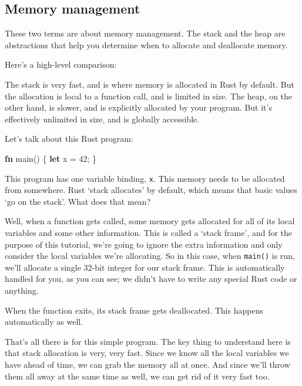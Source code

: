 \documentclass[a4paper,]{book}
\newenvironment{Shaded}{\begin{snugshade}}{\end{snugshade}}
\newcommand{\KeywordTok}[1]{\textcolor[rgb]{0.13,0.29,0.53}{\textbf{{#1}}}}
\newcommand{\DecValTok}[1]{\textcolor[rgb]{0.00,0.00,0.81}{{#1}}}
\newcommand{\NormalTok}[1]{{#1}}
\begin{document}
\subsection{Memory management}\label{memory-management}

These two terms are about memory management. The stack and the heap are
abstractions that help you determine when to allocate and deallocate
memory.

Here's a high-level comparison:

The stack is very fast, and is where memory is allocated in Rust by
default. But the allocation is local to a function call, and is limited
in size. The heap, on the other hand, is slower, and is explicitly
allocated by your program. But it's effectively unlimited in size, and
is globally accessible.


Let's talk about this Rust program:

\begin{Shaded}
\begin{Highlighting}[]
\KeywordTok{fn} \NormalTok{main() \{}
    \KeywordTok{let} \NormalTok{x = }\DecValTok{42}\NormalTok{;}
\NormalTok{\}}
\end{Highlighting}
\end{Shaded}

This program has one variable binding, \texttt{x}. This memory needs to
be allocated from somewhere. Rust `stack allocates' by default, which
means that basic values `go on the stack'. What does that mean?

Well, when a function gets called, some memory gets allocated for all of
its local variables and some other information. This is called a `stack
frame', and for the purpose of this tutorial, we're going to ignore the
extra information and only consider the local variables we're
allocating. So in this case, when \texttt{main()} is run, we'll allocate
a single 32-bit integer for our stack frame. This is automatically
handled for you, as you can see; we didn't have to write any special
Rust code or anything.

When the function exits, its stack frame gets deallocated. This happens
automatically as well.

That's all there is for this simple program. The key thing to understand
here is that stack allocation is very, very fast. Since we know all the
local variables we have ahead of time, we can grab the memory all at
once. And since we'll throw them all away at the same time as well, we
can get rid of it very fast too.
\end{document}

